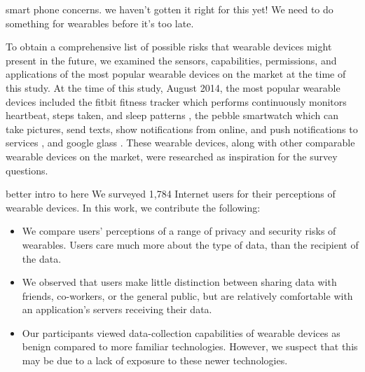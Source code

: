 {\color {red} smart phone concerns. we haven't gotten it right for this yet! We need to do something for wearables before it's too late.}

To obtain a comprehensive list of possible risks that wearable devices might present in the future, we examined the sensors, capabilities, permissions, and applications of the most popular wearable devices on the market at the time of this study. At the time of this study, August 2014, the most popular wearable devices included the fitbit fitness tracker which performs continuously monitors heartbeat, steps taken, and sleep patterns \cite{6_fitbit_2014, 7_time_2014}, the pebble smartwatch which can take pictures, send texts, show notifications from online, and push notifications to services \cite{pebble_smartwatch_2014, 9_verge_2014, 10_readwrite_2014}, and google glass \cite{11_wikipedia_2015, 12_turi_2014}. These wearable devices, along with other comparable wearable devices on the market, were researched as inspiration for the survey questions. 

{\color {red} better intro to here} We surveyed 1,784 Internet users for their perceptions of wearable devices. In this work, we contribute the following: \\[-0.8cm]

\begin{itemize} \itemsep1pt \parskip0pt 
\item We compare users' perceptions of a range of privacy and security risks of wearables. Users care much more about the type of data, than the recipient of the data.
\item We observed that users make little distinction between sharing data with friends, co-workers, or the general public, but are relatively comfortable with an application's servers receiving their data.
\item Our participants viewed data-collection capabilities of wearable devices as benign compared to more familiar technologies. However, we suspect that this may be due to a lack of exposure to these newer technologies.
\end{itemize}